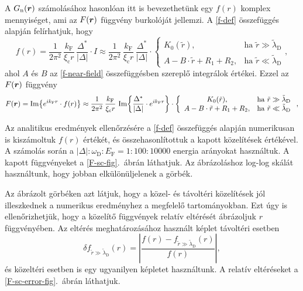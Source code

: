 \documentclass[a4paper,12pt,titlepage]{article}
\newcommand{\RR}{{\vb*{r}}}
\newcommand{\kF}{{k_\text{F}}}
\newcommand{\EF}{{E_\text{F}}}
\begin{document}
A $G_\text{n}(\RR)$ számolásához hasonlóan itt is bevezethetünk egy $f(r)$ komplex mennyiséget, ami az $F(\RR)$ függvény burkolóját jellemzi.  A \eqref{f-def} összefüggés alapján felírhatjuk, hogy
\begin{equation}
	f(r) = \frac{1}{2 \pi^2} \, \frac{\kF}{\xi_\text{c} r} \, \frac{\Delta^*}{\left| \Delta \right|} \cdot I \approx \frac{1}{2 \pi^2} \, \frac{\kF}{\xi_\text{c} r} \, \frac{\Delta^*}{\left| \Delta \right|} \cdot \left\{ \begin{array}{cl}
		K_0(\tilde{r}), & \text{ha } \tilde{r} \gg \tilde{\lambda}_\text{D} \\
		A - B \cdot \tilde{r} + R_1 + R_2, & \text{ha } \tilde{r} \ll \tilde{\lambda}_\text{D}
	\end{array} \right. ,
\end{equation}
ahol $A$ és $B$ az \eqref{f-near-field} összefüggésben szereplő integrálok értékei.  Ezzel az $F(\RR)$ függvény
\begin{equation}
	F(\RR) = \Im{e^{i \kF r} \cdot f(r)} \approx \frac{1}{2 \pi^2} \, \frac{\kF}{\xi_\text{c} r} \, \Im{\frac{\Delta^*}{\left| \Delta \right|} \cdot e^{i \kF r}} \cdot \left\{ \begin{array}{cl}
		K_0(\tilde{r}), & \text{ha } \tilde{r} \gg \tilde{\lambda}_\text{D} \\
		A - B \cdot \tilde{r} + R_1 + R_2, & \text{ha } \tilde{r} \ll \tilde{\lambda}_\text{D}
	\end{array} \right. ,
\end{equation}

Az analitikus eredmények ellenőrzésére a \eqref{f-def} összefüggés alapján numerikusan is kiszámoltuk $f(r)$ értékét, és összehasonlítottuk a kapott közelítések értékével.  A számolás során a $\left| \Delta \right| : \omega_\text{D} : \EF = 1 : 100 : 10000$ energia arányokat használtuk.  A kapott függvényeket a \ref{F-sc-fig}.\ ábrán láthatjuk.  Az ábrázoláshoz log-log skálát használtunk, hogy jobban elkülönüljelenek a görbék.

Az ábrázolt görbéken azt látjuk, hogy a közel- és távoltéri közelítések jól illeszkednek a numerikus eredményhez a megfelelő tartományokban.  Ezt úgy is ellenőrizhetjük, hogy a közelítő függvények relatív eltérését ábrázoljuk $r$ függvényében.  Az eltérés meghatározásához használt képlet távoltéri esetben
$$ \delta f_{\tilde{r} \gg \tilde{\lambda}_\text{D}}(r) = \left| \frac{f(r) - f_{\tilde{r} \gg \tilde{\lambda}_\text{D}}(r)}{f(r)} \right|, $$
és közeltéri esetben is egy ugyanilyen képletet használtunk.  A relatív eltéréseket a \ref{F-sc-error-fig}.\ ábrán láthatjuk.
\end{document}
